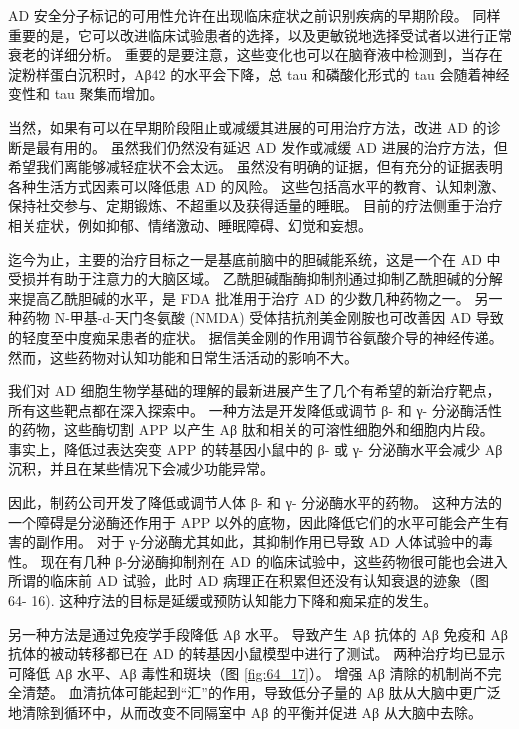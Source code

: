 AD 安全分子标记的可用性允许在出现临床症状之前识别疾病的早期阶段。
同样重要的是，它可以改进临床试验患者的选择，以及更敏锐地选择受试者以进行正常衰老的详细分析。
重要的是要注意，这些变化也可以在脑脊液中检测到，当存在淀粉样蛋白沉积时，Aβ42 的水平会下降，总 tau 和磷酸化形式的 tau 会随着神经变性和 tau 聚集而增加。


当然，如果有可以在早期阶段阻止或减缓其进展的可用治疗方法，改进 AD 的诊断是最有用的。
虽然我们仍然没有延迟 AD 发作或减缓 AD 进展的治疗方法，但希望我们离能够减轻症状不会太远。
虽然没有明确的证据，但有充分的证据表明各种生活方式因素可以降低患 AD 的风险。
这些包括高水平的教育、认知刺激、保持社交参与、定期锻炼、不超重以及获得适量的睡眠。
目前的疗法侧重于治疗相关症状，例如抑郁、情绪激动、睡眠障碍、幻觉和妄想。


迄今为止，主要的治疗目标之一是基底前脑中的胆碱能系统，这是一个在 AD 中受损并有助于注意力的大脑区域。 乙酰胆碱酯酶抑制剂通过抑制乙酰胆碱的分解来提高乙酰胆碱的水平，是 FDA 批准用于治疗 AD 的少数几种药物之一。 另一种药物 N-甲基-d-天门冬氨酸 (NMDA) 受体拮抗剂美金刚胺也可改善因 AD 导致的轻度至中度痴呆患者的症状。 据信美金刚的作用调节谷氨酸介导的神经传递。 然而，这些药物对认知功能和日常生活活动的影响不大。

我们对 AD 细胞生物学基础的理解的最新进展产生了几个有希望的新治疗靶点，所有这些靶点都在深入探索中。 一种方法是开发降低或调节 β- 和 γ- 分泌酶活性的药物，这些酶切割 APP 以产生 Aβ 肽和相关的可溶性细胞外和细胞内片段。 事实上，降低过表达突变 APP 的转基因小鼠中的 β- 或 γ- 分泌酶水平会减少 Aβ 沉积，并且在某些情况下会减少功能异常。

因此，制药公司开发了降低或调节人体 β- 和 γ- 分泌酶水平的药物。 这种方法的一个障碍是分泌酶还作用于 APP 以外的底物，因此降低它们的水平可能会产生有害的副作用。 对于 γ-分泌酶尤其如此，其抑制作用已导致 AD 人体试验中的毒性。 现在有几种 β-分泌酶抑制剂在 AD 的临床试验中，这些药物很可能也会进入所谓的临床前 AD 试验，此时 AD 病理正在积累但还没有认知衰退的迹象（图 64- 16). 这种疗法的目标是延缓或预防认知能力下降和痴呆症的发生。

另一种方法是通过免疫学手段降低 Aβ 水平。 导致产生 Aβ 抗体的 Aβ 免疫和 Aβ 抗体的被动转移都已在 AD 的转基因小鼠模型中进行了测试。 两种治疗均已显示可降低 Aβ 水平、Aβ 毒性和斑块（图 \ref{fig:64_17}）。 增强 Aβ 清除的机制尚不完全清楚。 血清抗体可能起到“汇”的作用，导致低分子量的 Aβ 肽从大脑中更广泛地清除到循环中，从而改变不同隔室中 Aβ 的平衡并促进 Aβ 从大脑中去除。

